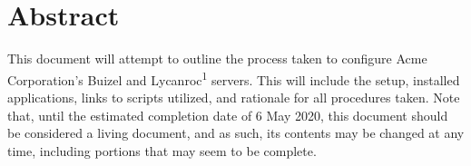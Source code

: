 \documentclass[
10pt, %
letterpaper, %
oneside, %
headinclude,footinclude, %
BCOR5mm, %
]{scrartcl}
\title{\normalfont\spacedallcaps{CIS245 - Linux Administration}} %
\author{\spacedlowsmallcaps{Holly Montalvo}}
\date{} %
\begin{document}

\renewcommand{\sectionmark}[1]{\markright{\spacedlowsmallcaps{#1}}} %
\lehead{\mbox{\llap{\small\thepage\kern1em\color{halfgray} \vline}\color{halfgray}\hspace{0.5em}\rightmark\hfil}} %

\pagestyle{scrheadings} %


\maketitle %

\setcounter{tocdepth}{2} %

\tableofcontents %




\section*{Abstract} %

This document will attempt to outline the process taken to configure Acme Corporation's Buizel and Lycanroc\textsuperscript{1} servers. This will include the setup, installed applications, links to scripts utilized, and rationale for all procedures taken. Note that, until the estimated completion date of 6 May 2020, this document should be considered a living document, and as such, its contents may be changed at any time, including portions that may seem to be complete.
\end{document}

